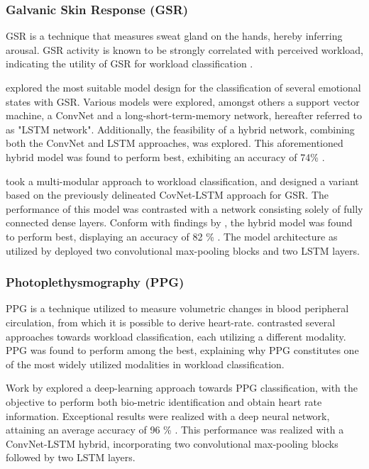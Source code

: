 \documentclass[12pt]{article}
\begin{document}
\subsubsection{Galvanic Skin Response (GSR)}
GSR is a technique that measures sweat gland on the hands, hereby inferring arousal. GSR activity is known to be strongly correlated with perceived workload, indicating the utility of GSR for workload classification \cite{shi2007galvanic}. 

 explored the most suitable model design for the classification of several emotional states with GSR. Various models were explored, amongst others a support vector machine, a ConvNet and a long-short-term-memory network, hereafter referred to as "LSTM network". Additionally, the feasibility of a hybrid network, combining both the ConvNet and LSTM approaches, was explored. This aforementioned hybrid model was found to perform best, exhibiting an accuracy of 74\% \cite{sun2019hybrid}. 

 took a multi-modular approach to workload classification, and designed a variant based on the previously delineated CovNet-LSTM approach for GSR. The performance of this model was contrasted with a network consisting solely of fully connected dense layers. Conform with findings by  , the hybrid model was found to perform best, displaying an accuracy of 82 \% \cite{dolmans2020perceived}. The model architecture as utilized by  deployed two convolutional max-pooling blocks and two LSTM layers.

\subsubsection{Photoplethysmography (PPG)}
PPG is a technique utilized to measure volumetric changes in blood peripheral circulation, from which it is possible to derive heart-rate.  contrasted several approaches towards workload classification, each utilizing a different modality. PPG was found to perform among the best, explaining why PPG constitutes one of the most widely utilized modalities in workload classification. 

Work by  explored a deep-learning approach towards PPG classification, with the objective to perform both bio-metric identification and obtain heart rate information. Exceptional results were realized with a deep neural network, attaining an average accuracy of 96 \% \cite{biswas2019cornet}. This performance was realized with a ConvNet-LSTM hybrid, incorporating two convolutional max-pooling blocks followed by two LSTM layers. 
\end{document}
